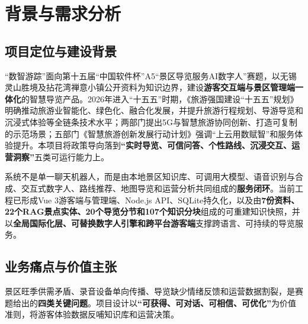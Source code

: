\chapter{背景与需求分析}

\section{项目定位与建设背景}

“数智游踪”面向第十五届“中国软件杯”A5“景区导览服务AI数字人”赛题，以无锡灵山胜境及拈花湾禅意小镇公开资料为知识边界，建设\textbf{游客交互端与景区管理端一体化}的智慧导览产品。2026年进入“十五五”时期，《旅游强国建设“十五五”规划》明确推动旅游业智能化、绿色化、融合化发展，并提升旅游行程规划、导游导览和沉浸式体验等全链条技术水平；两部门提出5G与智慧旅游协同创新、打造可复制的示范场景；五部门《智慧旅游创新发展行动计划》强调“上云用数赋智”和服务体验提升。本项目将政策导向落到\textbf{“实时导览、可信问答、个性路线、沉浸交互、运营洞察”}五类可运行能力上。

系统不是单一聊天机器人，而是由本地景区知识库、可调用大模型、语音识别与合成、交互式数字人、路线推荐、地图导览和运营分析共同组成的\textbf{服务闭环}。当前工程已形成Vue 3游客端与管理端、Node.js API、SQLite持久化，以及由\textbf{7份资料、22个RAG景点实体、20个导览分节和107个知识分块}组成的可重建知识快照，并以\textbf{全局国际化层、可替换数字人引擎和跨平台游客端}支撑跨语言、可持续的导览服务。

\section{业务痛点与价值主张}

景区旺季供需矛盾、录音设备单向传播、导览缺少情绪反馈和运营数据割裂，是赛题给出的\textbf{四类关键问题}。项目设计以\textbf{“可获得、可对话、可相信、可优化”}为价值准则，将游客体验数据反哺知识库和运营决策。

